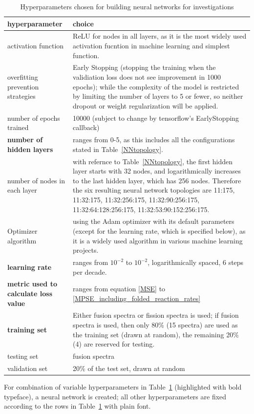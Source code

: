 \documentclass[a4paper, 12pt]{article}
\begin{document}
\begin{table}[H]
\begin{tabularx}{\textwidth}{lX}
hyperparameter & choice  \\
\hline
activation function & ReLU\cite{ReLU} for nodes in all layers, as it is the most widely used activation fucntion in machine learning and simplest function. \\
overfitting prevention strategies & Early Stopping (stopping the training when the validiation loss does not see improvement in 1000 epochs); while the complexity of the model is restricted by limiting the number of layers to 5 or fewer, so neither dropout or weight regularization will be applied. \\
number of epochs trained & 10000 (subject to change by tensorflow's EarlyStopping callback) \\
\textbf{number of hidden layers} & ranges from 0-5, as this includes all the configurations stated in Table~\ref{NNtopology}. \\
number of nodes in each layer & with refernce to Table~\ref{NNtopology}, the first hidden layer starts with 32 nodes, and logarithmically increases to the last hidden layer, which has 256 nodes. Therefore the six resulting neural network topologies are 11:175, 11:32:175, 11:32:256:175, 11:32:90:256:175, 11:32:64:128:256:175, 11:32:53:90:152:256:175.\\
Optimizer algorithm & using the Adam optimizer\cite{AdamOptimizer} with its default parameters (except for the learning rate, which is specified below), as it is a widely used algorithm in various machine learning projects.\\
\textbf{learning rate} & ranges from $10^{-2}$ to $10^{-2}$, logarithmically spaced, 6 steps per decade.\\
\textbf{metric used to calculate loss value} & ranges from equation \ref{MSE} to \ref{MPSE_including_folded_reaction_rates}\\
\textbf{training set} & Either fusion spectra or fission spectra is used; if fusion spectra is used, then only 80\% (15 spectra) are used as the training set (drawn at random), the remaining 20\%(4) are reserved for testing. \\
testing set & fusion spectra\\
validation set & 20\% of the test set, drawn at random
\end{tabularx}
\caption{Hyperparameters chosen for building neural networks for investigations}\label{HyperparameterRange}
\end{table}
For combination of variable hyperparameters in Table~\ref{HyperparameterRange} (highlighted with bold typeface), a neural network is created; all other hyperparameters are fixed according to the rows in Table~\ref{HyperparameterRange} with plain font.
\end{document}

